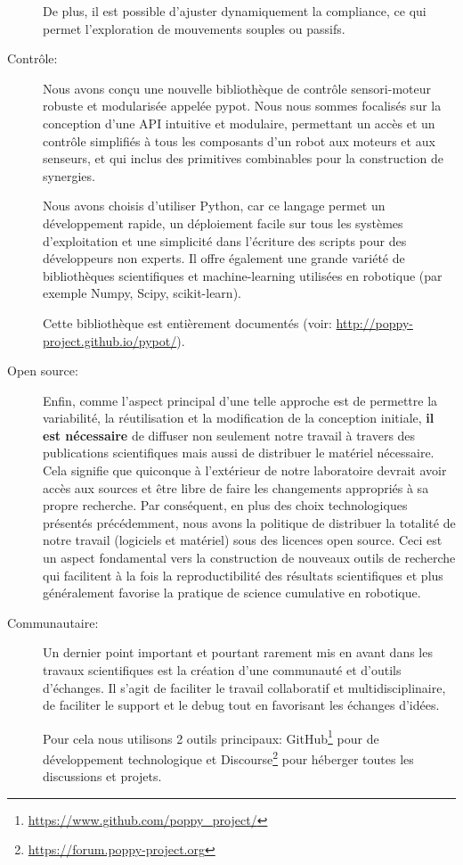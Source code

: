 \begin{description}
  De plus, il est possible d'ajuster dynamiquement la compliance, ce qui permet l'exploration de mouvements souples ou passifs.

  \item[Contrôle:] Nous avons conçu une nouvelle bibliothèque de contrôle sensori-moteur robuste et modularisée appelée pypot. Nous nous sommes focalisés sur la conception d'une API intuitive et modulaire, permettant un accès et un contrôle simplifiés à tous les composants d'un robot aux moteurs et aux senseurs, et qui inclus des primitives combinables pour la construction de synergies.

  Nous avons choisis d'utiliser Python, car ce langage permet un développement rapide, un déploiement facile sur tous les systèmes d'exploitation et une simplicité dans l'écriture des scripts pour des développeurs non experts. Il offre également une grande variété de bibliothèques scientifiques et machine-learning utilisées en robotique (par exemple Numpy, Scipy, scikit-learn).

  Cette bibliothèque est entièrement documentés (voir: \url{http://poppy-project.github.io/pypot/}).
  
  \item[Open source:] Enfin, comme l'aspect principal d'une telle approche est de permettre la variabilité, la réutilisation et la modification de la conception initiale, \textbf{il est nécessaire} de diffuser non seulement notre travail à travers des publications scientifiques mais aussi de distribuer le matériel nécessaire. 
  Cela signifie que quiconque à l'extérieur de notre laboratoire devrait avoir accès aux sources et être libre de faire les changements appropriés à sa propre recherche. Par conséquent, en plus des choix technologiques présentés précédemment, nous avons la politique de distribuer la totalité de notre travail (logiciels et matériel) sous des licences open source. Ceci est un aspect fondamental vers la construction de nouveaux outils de recherche qui facilitent à la fois la reproductibilité des résultats scientifiques et plus généralement favorise la pratique de science cumulative en robotique.

  \item[Communautaire:] Un dernier point important et pourtant rarement mis en avant dans les travaux scientifiques est la création d'une communauté et d'outils d'échanges. Il s'agit de faciliter le travail collaboratif et multidisciplinaire, de faciliter le support et le debug tout en favorisant les échanges d'idées. 

  Pour cela nous utilisons 2 outils principaux: GitHub\footnote{\url{https://www.github.com/poppy_project/}} pour de développement technologique et Discourse\footnote{\url{https://forum.poppy-project.org}} pour héberger toutes les discussions et projets.

\end{description}

